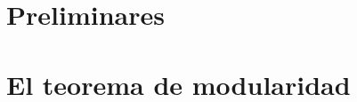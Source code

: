 \documentclass[12pt]{report}
\begin{document}

\tableofcontents
\newpage



\chapter{Preliminares}









%

\chapter{El teorema de modularidad}

%





%





%

{}

\end{document}
